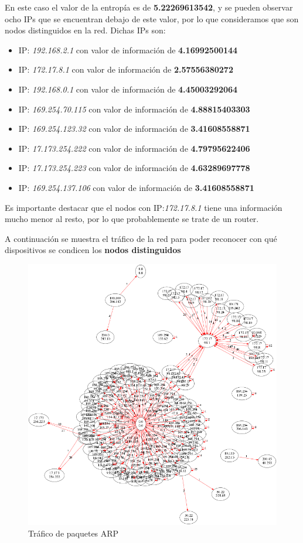 En este caso el valor de la entropía es de \textbf{5.22269613542}, y se pueden observar ocho IPs que se encuentran debajo de este valor, por lo que consideramos que son nodos distinguidos en la red. Dichas IPs son:
\begin{itemize}
\item IP: \textit{192.168.2.1} con valor de información de \textbf{4.16992500144}
\item IP: \textit{172.17.8.1} con valor de información de \textbf{2.57556380272}
\item IP: \textit{192.168.0.1} con valor de información de \textbf{4.45003292064}
\item IP: \textit{169.254.70.115} con valor de información de \textbf{4.88815403303}
\item IP: \textit{169.254.123.32} con valor de información de \textbf{3.41608558871}
\item IP: \textit{17.173.254.222} con valor de información de \textbf{4.79795622406}
\item IP: \textit{17.173.254.223} con valor de información de \textbf{4.63289697778}
\item IP: \textit{169.254.137.106} con valor de información de \textbf{3.41608558871}
\end{itemize}

Es importante destacar que el nodos con IP:\textit{172.17.8.1} tiene una información mucho menor al resto, por lo que probablemente se trate de un router.

A continuación se muestra el tráfico de la red para poder reconocer con qué dispositivos se condicen los \textbf{nodos distinguidos}

\begin{figure}[H]
       \centering
       \includegraphics[width=1\textwidth]{../resultados/McDonalds/network.png}
       \caption{Tráfico de paquetes ARP}
       \label{red-hogarena-arp-traffic}
\end{figure}

